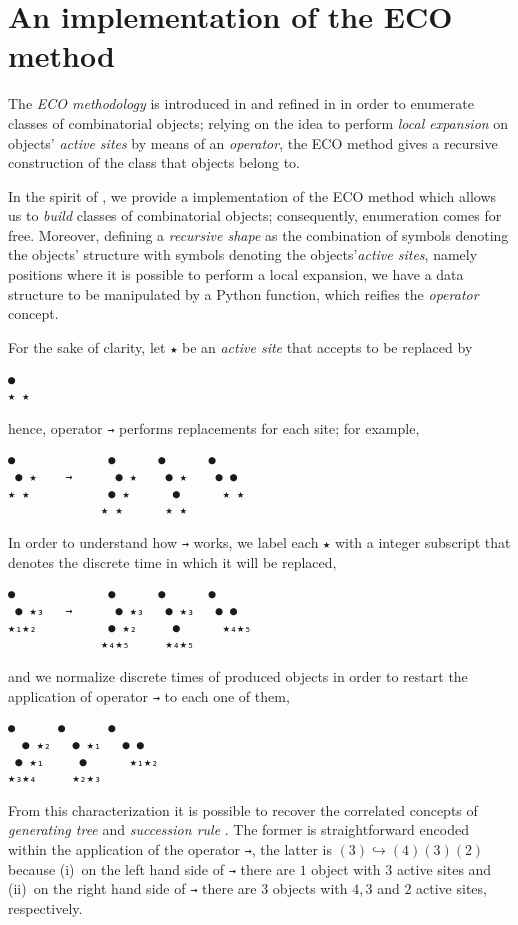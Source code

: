 \section{An implementation of the ECO method}

The \textit{ECO methodology} is introduced in \citep{BARCUCCI199845} and
refined in \citep{doi:10.1080/10236199908808200} in order to enumerate classes
of combinatorial objects; relying on the idea to perform \textit{local
expansion} on objects' \textit{active sites} by means of an \textit{operator},
the ECO method gives a recursive construction of the class that objects belong
to.
\iffalse
and it yields functional equations about the classes that, once
solved, enumerate objects with respect to various parameters; nonetheless
powerful, the latter feature outperforms the goal of this section.
\fi

In the spirit of \citep{Bernini2007AnEG,Bacchelli2004}, we provide a
implementation of the ECO method which allows us to \textit{build} classes of
combinatorial objects; consequently, enumeration comes for free.  Moreover,
defining a \textit{recursive shape} as the combination of symbols denoting the
objects' structure with symbols denoting the objects'\textit{active sites},
namely positions where it is possible to perform a local expansion, we have a
data structure to be manipulated by a Python function, which reifies the
\textit{operator} concept.

For the sake of clarity, let \verb|★| be an \textit{active site} that accepts
to be replaced by
\begin{Verbatim}[baselinestretch=0.5]
 ●
★ ★
\end{Verbatim}
hence, operator \verb|→| performs replacements for each site; for example,
\begin{Verbatim}[baselinestretch=0.5]
  ●             ●      ●      ●
 ● ★    →      ● ★    ● ★    ● ●
★ ★           ● ★      ●      ★ ★
             ★ ★      ★ ★
\end{Verbatim}
In order to understand how \verb|→| works, we label each \verb|★| with
a integer subscript that denotes the discrete time in which it will be
replaced,
\begin{Verbatim}[baselinestretch=0.5]
  ●             ●      ●      ●
 ● ★₃   →      ● ★₃   ● ★₃   ● ●
★₁★₂          ● ★₂     ●      ★₄★₅
             ★₄★₅     ★₄★₅
\end{Verbatim}
and we normalize discrete times of produced objects in order to restart the
application of operator \verb|→| to each one of them,
\begin{Verbatim}[baselinestretch=0.5]
   ●      ●      ●
  ● ★₂   ● ★₁   ● ●
 ● ★₁     ●      ★₁★₂
★₃★₄     ★₂★₃
\end{Verbatim}
From this characterization it is possible to recover the correlated concepts of
\textit{generating tree} and \textit{succession rule} \citep{CHUNG1978382}.
The former is straightforward encoded within the application of the operator
\verb|→|, the latter is $(3) \hookrightarrow (4)(3)(2)$ because (i)~on the left
hand side of \verb|→| there are $1$ object with $3$ active sites and (ii)~on
the right hand side of \verb|→| there are $3$ objects with $4, 3$ and $2$
active sites, respectively.

